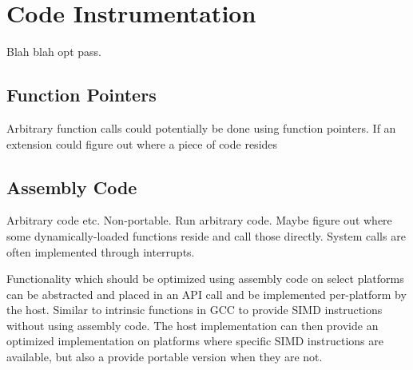 \chapter {Code Instrumentation}

Blah blah opt pass.


\section {Function Pointers}

Arbitrary function calls could potentially be done using function pointers. If
an extension could figure out where a piece of code resides


\section {Assembly Code}

Arbitrary code etc. Non-portable. Run arbitrary code. Maybe figure out where
some dynamically-loaded functions reside and call those directly. System calls
are often implemented through interrupts. 

Functionality which should be optimized using assembly code on select platforms
can be abstracted and placed in an API call and be implemented per-platform by
the host. Similar to intrinsic functions in GCC to provide SIMD instructions
without using assembly code. The host implementation can then provide an
optimized implementation on platforms where specific SIMD instructions are
available, but also a provide portable version when they are not.
